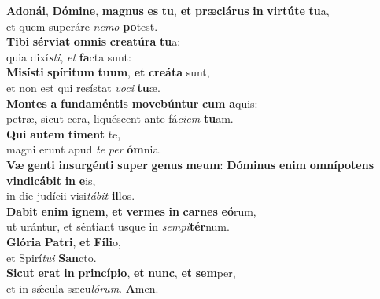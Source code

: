 \evenverse \textbf{A}\textbf{do}\textbf{ná}\textbf{i}, \textbf{Dó}\textbf{mi}\textbf{ne}, \textbf{ma}\textbf{gnus} \textbf{es} \textbf{tu}, \textbf{et} \textbf{præ}\textbf{clá}\textbf{rus} \textbf{in} \textbf{vir}\textbf{tú}\textbf{te} \textbf{tu}a,~\*\\
\evenverse et quem superáre \textit{ne}\textit{mo} \textbf{po}test.\\
\oddverse \textbf{Ti}\textbf{bi} \textbf{sér}\textbf{vi}\textbf{at} \textbf{om}\textbf{nis} \textbf{cre}\textbf{a}\textbf{tú}\textbf{ra} \textbf{tu}a:~\*\\
\oddverse quia dixí\textit{sti}, \textit{et} \textbf{fa}cta sunt:\\
\evenverse \textbf{Mi}\textbf{sí}\textbf{sti} \textbf{spí}\textbf{ri}\textbf{tum} \textbf{tu}\textbf{um}, \textbf{et} \textbf{cre}\textbf{á}\textbf{ta} sunt,~\*\\
\evenverse et non est qui resístat \textit{vo}\textit{ci} \textbf{tu}æ.\\
\oddverse \textbf{Mon}\textbf{tes} \textbf{a} \textbf{fun}\textbf{da}\textbf{mén}\textbf{tis} \textbf{mo}\textbf{ve}\textbf{bún}\textbf{tur} \textbf{cum} \textbf{a}quis:~\*\\
\oddverse petræ, sicut cera, liquéscent ante fá\textit{ci}\textit{em} \textbf{tu}am.\\
\evenverse \textbf{Qui} \textbf{au}\textbf{tem} \textbf{ti}\textbf{ment} te,~\*\\
\evenverse magni erunt apud \textit{te} \textit{per} \textbf{óm}nia.\\
\oddverse \textbf{Væ} \textbf{gen}\textbf{ti} \textbf{in}\textbf{sur}\textbf{gén}\textbf{ti} \textbf{su}\textbf{per} \textbf{ge}\textbf{nus} \textbf{me}\textbf{um}: \textbf{Dó}\textbf{mi}\textbf{nus} \textbf{e}\textbf{nim} \textbf{om}\textbf{ní}\textbf{po}\textbf{tens} \textbf{vin}\textbf{di}\textbf{cá}\textbf{bit} \textbf{in} \textbf{e}is,~\*\\
\oddverse in die judícii visi\textit{tá}\textit{bit} \textbf{il}los.\\
\evenverse \textbf{Da}\textbf{bit} \textbf{e}\textbf{nim} \textbf{i}\textbf{gnem}, \textbf{et} \textbf{ver}\textbf{mes} \textbf{in} \textbf{car}\textbf{nes} \textbf{e}\textbf{ó}rum,~\*\\
\evenverse ut urántur, et séntiant usque in \textit{sem}\textit{pi}\textbf{tér}num.\\
\oddverse \textbf{Gló}\textbf{ri}\textbf{a} \textbf{Pa}\textbf{tri}, \textbf{et} \textbf{Fí}\textbf{li}o,~\*\\
\oddverse et Spirí\textit{tu}\textit{i} \textbf{San}cto.\\
\evenverse \textbf{Si}\textbf{cut} \textbf{e}\textbf{rat} \textbf{in} \textbf{prin}\textbf{cí}\textbf{pi}\textbf{o}, \textbf{et} \textbf{nunc}, \textbf{et} \textbf{sem}per,~\*\\
\evenverse et in sǽcula sæcu\textit{ló}\textit{rum}. \textbf{A}men.\\

